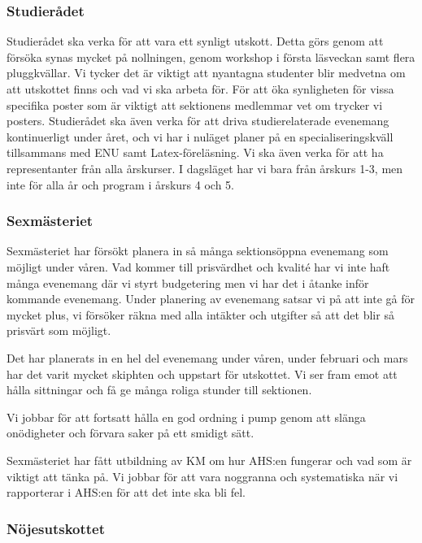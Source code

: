 \documentclass[../_main/handlingar.tex]{subfiles}
\begin{document}
\subsubsection*{Studierådet}

Studierådet ska verka för att vara ett synligt utskott. Detta görs genom att försöka synas mycket på nollningen, genom workshop i första läsveckan samt flera pluggkvällar. Vi tycker det är viktigt att nyantagna studenter blir medvetna om att utskottet finns och vad vi ska arbeta för. För att öka synligheten för vissa specifika poster som är viktigt att sektionens medlemmar vet om trycker vi posters. Studierådet ska även verka för att driva studierelaterade evenemang kontinuerligt under året, och vi har i nuläget planer på en specialiseringskväll tillsammans med ENU samt Latex-föreläsning. Vi ska även verka för att ha representanter från alla årskurser. I dagsläget har vi bara från årskurs 1-3, men inte för alla år och program i årskurs 4 och 5. 

\newpage

\subsubsection*{Sexmästeriet}


Sexmästeriet har försökt planera in så många sektionsöppna evenemang som möjligt under våren. Vad kommer till prisvärdhet och kvalité har vi inte haft många evenemang där vi styrt budgetering men vi har det i åtanke inför kommande evenemang. Under planering av evenemang satsar vi på att inte gå för mycket plus, vi försöker räkna med alla intäkter och utgifter så att det blir så prisvärt som möjligt. 

Det har planerats in en hel del evenemang under våren, under februari och mars har det varit mycket skiphten och uppstart för utskottet. Vi ser fram emot att hålla sittningar och få ge många roliga stunder till sektionen.

Vi jobbar för att fortsatt hålla en god ordning i pump genom att slänga onödigheter och förvara saker på ett smidigt sätt.

Sexmästeriet har fått utbildning av KM om hur AHS:en fungerar och vad som är viktigt att tänka på. Vi jobbar för att vara noggranna och systematiska när vi rapporterar i AHS:en för att det inte ska bli fel. 



\subsubsection*{Nöjesutskottet}
\end{document}
